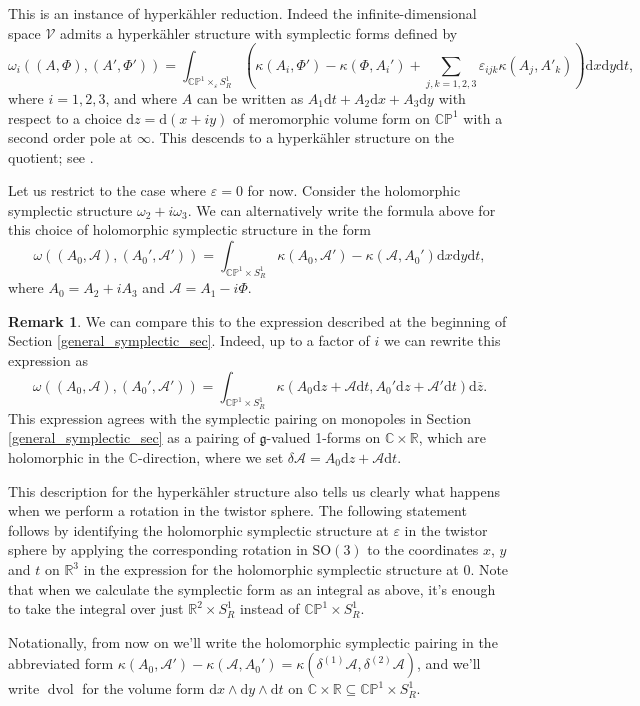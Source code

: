 \documentclass[11pt, oneside, reqno]{amsart}
\theoremstyle{definition} \newtheorem{definition}{Definition}[section]
\theoremstyle{definition} \newtheorem{remark}[definition]{Remark}
\theoremstyle{definition} \newtheorem{remarks}[definition]{Remarks}
\theoremstyle{definition} \newtheorem{question}[definition]{Question}
\theoremstyle{definition} \newtheorem*{note}{Note}
\theoremstyle{definition} \newtheorem{example}[definition]{Example}
\theoremstyle{definition} \newtheorem{examples}[definition]{Examples}
\renewcommand{\gg}{\mathfrak{g}}
\newcommand{\bb}[1]{\mathbb{#1}}
\newcommand{\mc}[1]{\mathcal{#1}}
\newcommand{\ol}[1]{\overline{#1}}
\newcommand{\CC}{\mathbb{C}}
\newcommand{\RR}{\mathbb{R}}
\newcommand{\eps}{\varepsilon}
\newcommand{\SO}{\mathrm{SO}}
\newcommand{\sub}{\subseteq}
\DeclareMathOperator{\dvol}{dvol}
\renewcommand{\d}{\mathrm{d}}
\begin{document}
This is an instance of hyperk\"ahler reduction.  Indeed the infinite-dimensional space $\mc V$ admits a hyperk\"ahler structure with symplectic forms defined by
\[\omega_i((A,\Phi),(A',\Phi')) = \int_{\bb{CP}^1 \times_\eps S^1_R} \left(\kappa(A_i,\Phi') - \kappa(\Phi, A_i') + \sum_{j,k=1,2,3} \eps_{ijk} \kappa(A_j,A'_k)\right) \d x \d y \d t, \]
where $i=1,2,3$, and where $A$ can be written as $A_1 \d t + A_2 \d x + A_3 \d y$ with respect to a choice $\d z = \d (x + iy)$ of meromorphic volume form on $\bb{CP}^1$ with a second order pole at $\infty$.  This descends to a hyperk\"ahler structure on the quotient; see \cite[Section 1.4.2]{FoscoloThesis}.

Let us restrict to the case where $\eps=0$ for now.  Consider the holomorphic symplectic structure $\omega_2 + i \omega_3$.  We can alternatively write the formula above for this choice of holomorphic symplectic structure in the form
\[\omega((A_0, \mc A), (A_0', \mc A')) = \int_{\bb{CP}^1 \times S^1_R} \kappa(A_0, \mc A') - \kappa(\mc A, A_0') \d x \d y \d t,\]
where $A_0 = A_2 + i A_3$ and $\mc A = A_1 - i \Phi$.  

\begin{remark}
We can compare this to the expression described at the beginning of Section \ref{general_symplectic_sec}. Indeed, up to a factor of $i$ we can rewrite this expression as
\[\omega((A_0, \mc A), (A_0', \mc A')) = \int_{\bb{CP}^1 \times S^1_R} \kappa(A_0\d z + \mc A \d t, A_0' \d z + \mc A' \d t) \d \ol{z}.\]
This expression agrees with the symplectic pairing on monopoles in Section \ref{general_symplectic_sec} as a pairing of $\gg$-valued 1-forms on $\CC \times \RR$, which are holomorphic in the $\CC$-direction, where we set $\delta \mc A = A_0\d z + \mc A \d t$.
\end{remark}

This description for the hyperk\"ahler structure also tells us clearly what happens when we perform a rotation in the twistor sphere.  The following statement follows by identifying the holomorphic symplectic structure at $\eps$ in the twistor sphere by applying the corresponding rotation in $\SO(3)$ to the coordinates $x$, $y$ and $t$ on $\RR^3$ in the expression for the holomorphic symplectic structure at $0$.  Note that when we calculate the symplectic form as an integral as above, it's enough to take the integral over just $\RR^2 \times S^1_R$ instead of $\bb{CP}^1 \times S^1_R$.

Notationally, from now on we'll write the holomorphic symplectic pairing in the abbreviated form $\kappa(A_0, \mc A') - \kappa(\mc A, A_0') = \kappa(\delta^{(1)} \mc A, \delta^{(2)} \mc A)$, and we'll write $\dvol$ for the volume form $\d x \wedge \d y \wedge \d t$ on $\CC \times \RR \sub \bb{CP}^1 \times S^1_R$.
\end{document}
